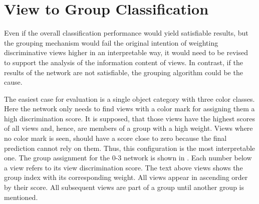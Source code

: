 \section{View to Group Classification}
\label{sec:results-grouping}
Even if the overall classification performance would yield satisfiable results, but the grouping mechanism would fail the original intention of weighting discriminative views higher in an interpretable way, it would need to be revised to support the analysis of the information content of views.
In contrast, if the results of the network are not satisfiable, the grouping algorithm could be the cause.

The easiest case for evaluation is a single object category with three color classes.
Here the network only needs to find views with a color mark for assigning them a high discrimination score.
It is supposed, that those views have the highest scores of all views and, hence, are members of a group with a high weight.
Views where no color mark is seen, should have a score close to zero because the final prediction cannot rely on them.
Thus, this configuration is the most interpretable one.
The group assignment for the 0-3 network is shown in .
Each number below a view refers to its view discrimination score.
The text above views shows the group index with its corresponding weight.
All views appear in ascending order by their score.
All subsequent views are part of a group until another group is mentioned.
